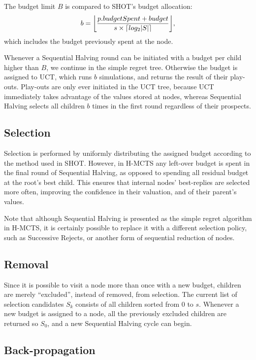 \documentclass{kecsmstr}
\DeclarePairedDelimiter{\ceil}{\lceil}{\rceil}
\DeclarePairedDelimiter{\floor}{\lfloor}{\rfloor}
\begin{document}
The budget limit $B$ is compared to SHOT's budget allocation:
\begin{equation}
	b = \floor[\bigg]{\frac{p.budgetSpent + budget}{s\times\ceil{log_2{|S|}}}},
\end{equation}
which includes the budget previously spent at the node.

Whenever a Sequential Halving round can be initiated with a budget per child higher than $B$, we continue in the simple regret tree. Otherwise the budget is assigned to UCT, which runs $b$ simulations, and returns the result of their play-outs. Play-outs are only ever initiated in the UCT tree, because UCT immediately takes advantage of the values stored at nodes, whereas Sequential Halving selects all children $b$ times in the first round regardless of their prospects. 

\subsection{Selection}
Selection is performed by uniformly distributing the assigned budget according to the method used in SHOT. However, in H-MCTS any left-over budget is spent in the final round of Sequential Halving, as opposed to spending all residual budget at the root's best child. This ensures that internal nodes' best-replies are selected more often, improving the confidence in their valuation, and of their parent's values.

Note that although Sequential Halving is presented as the simple regret algorithm in H-MCTS, it is certainly possible to replace it with a different selection policy, such as Successive Rejects, or another form of sequential reduction of nodes.

\subsection{Removal}
Since it is possible to visit a node more than once with a new budget, children are merely ``excluded'', instead of removed, from selection. The current list of selection candidates $S_k$ consists of all children sorted from 0 to $s$. Whenever a new budget is assigned to a node, all the previously excluded children are returned so $S_0$, and a new Sequential Halving cycle can begin.

\subsection{Back-propagation}
\end{document}
